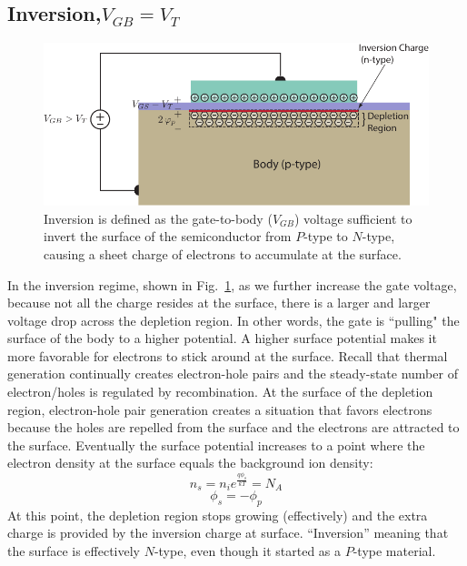 \subsection{Inversion\texorpdfstring{,\;$V_{GB}=V_T$}{}}
\begin{figure}[tbh]
\centering
\includegraphics[width=.75\columnwidth]{mos_cap_inversion}
\caption{Inversion is defined as the gate-to-body ($V_{GB}$) voltage sufficient to invert the surface of the semiconductor from $P$-type to $N$-type, causing a sheet charge of electrons to accumulate at the surface.}
\label{fig:mos_inv}
\end{figure}
In the inversion regime, shown in Fig.~\ref{fig:mos_inv}, as we further increase the gate voltage, because not all the charge resides at the surface, there is a larger and larger voltage drop across the depletion region.  In other words, the gate is ``pulling" the surface of the body to a higher potential.  A higher surface potential makes it more favorable for electrons to stick around at the surface.  Recall that thermal generation continually creates electron-hole pairs and the steady-state number of electron/holes is regulated by recombination.  At the surface of the depletion region, electron-hole pair generation creates a situation that favors electrons because the holes are repelled from the surface and the electrons are attracted to the surface.  Eventually the surface potential increases to a point where the electron density at the surface equals the background ion density:
    \begin{equation}
        {n_s} = {n_i}{e^{\frac{{q{\phi _s}}}{{kT}}}} = {N_A}
    \end{equation}
    \begin{equation}
        {\phi _s} =  - {\phi _p}
    \end{equation}
At this point, the depletion region stops growing (effectively) and the extra charge is provided by the inversion charge at surface.  “Inversion” meaning that the surface is effectively $N$-type, even though it started as a $P$-type material.  
